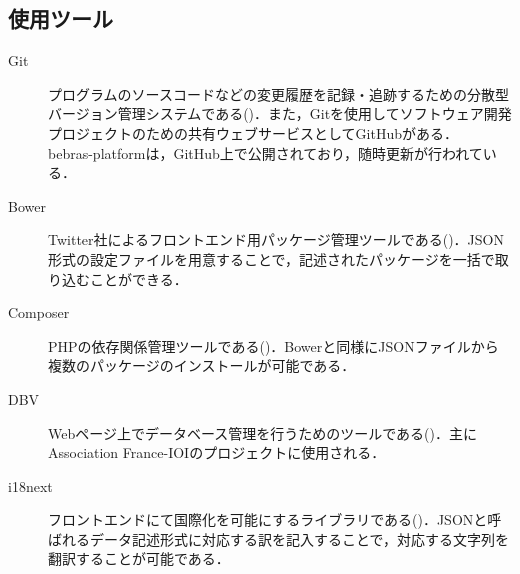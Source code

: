 \documentclass[a4paper]{jarticle}
\begin{document}
\begin{multicols}{2}
\subsection{使用ツール}
\begin{description}
\item[Git]プログラムのソースコードなどの変更履歴を記録・追跡するための分散型バージョン管理システムである(\cite{git})．また，Gitを使用してソフトウェア開発プロジェクトのための共有ウェブサービスとしてGitHubがある．\\ bebras-platformは，GitHub上で公開されており，随時更新が行われている．
\end{description}

\begin{description}
\item[Bower]Twitter社によるフロントエンド用パッケージ管理ツールである(\cite{bower})．JSON形式の設定ファイルを用意することで，記述されたパッケージを一括で取り込むことができる．\end{description}

\begin{description}
\item[Composer] PHPの依存関係管理ツールである(\cite{composer})．Bowerと同様にJSONファイルから複数のパッケージのインストールが可能である．
\end{description}

\begin{description}
\item[DBV]  Webページ上でデータベース管理を行うためのツールである(\cite{dbv})．主にAssociation France-IOIのプロジェクトに使用される．\end{description}

\begin{description}
\item[i18next] フロントエンドにて国際化を可能にするライブラリである(\cite{i18n})．JSONと呼ばれるデータ記述形式に対応する訳を記入することで，対応する文字列を翻訳することが可能である．%
\end{description}


\end{multicols}
\end{document}
